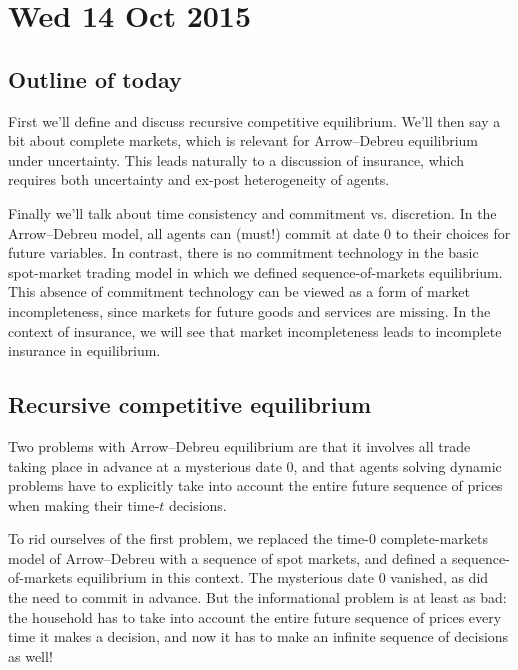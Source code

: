 \documentclass[11pt,letterpaper,reqno,oneside]{article}
\begin{document}
\pagebreak
\section{Wed 14 Oct 2015}
\label{sec:14Oct2015}


\subsection{Outline of today}
\label{sec:14Oct2015:outline_of_today}

First we'll define and discuss recursive competitive equilibrium. We'll then say a bit about complete markets, which is relevant for Arrow--Debreu equilibrium under uncertainty. This leads naturally to a discussion of insurance, which requires both uncertainty and ex-post heterogeneity of agents.

Finally we'll talk about time consistency and commitment vs. discretion. In the Arrow--Debreu model, all agents can (must!) commit at date $0$ to their choices for future variables. In contrast, there is no commitment technology in the basic spot-market trading model in which we defined sequence-of-markets equilibrium. This absence of commitment technology can be viewed as a form of market incompleteness, since markets for future goods and services are missing. In the context of insurance, we will see that market incompleteness leads to incomplete insurance in equilibrium.



\subsection{Recursive competitive equilibrium}
\label{sec:14Oct2015:recursive_competitive_eqm}

Two problems with Arrow--Debreu equilibrium are that it involves all trade taking place in advance at a mysterious date 0, and that agents solving dynamic problems have to explicitly take into account the entire future sequence of prices when making their time-$t$ decisions.

To rid ourselves of the first problem, we replaced the time-0 complete-markets model of Arrow--Debreu with a sequence of spot markets, and defined a sequence-of-markets equilibrium in this context. The mysterious date 0 vanished, as did the need to commit in advance. But the informational problem is at least as bad: the household has to take into account the entire future sequence of prices every time it makes a decision, and now it has to make an infinite sequence of decisions as well!
\end{document}
